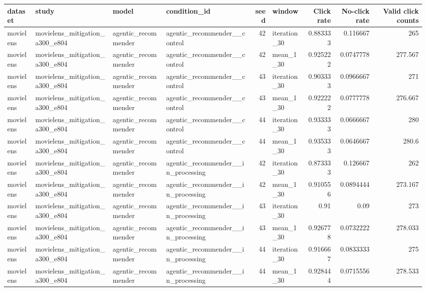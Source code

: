 \begin{table}[htbp!]
\centering
\small
\setlength{\tabcolsep}{3pt}
\renewcommand{\arraystretch}{1.1}
\begin{tabular}{llllrlrrr}
\hline
dataset & study & model & condition\_id & seed & window & Click rate & No-click rate & Valid click counts \\
\hline
movielens & movielens\_mitigation\_a300\_e804 & agentic\_recommender & agentic\_recommender\_\_control & 42 & iteration\_30 & 0.883333 & 0.116667 & 265 \\
movielens & movielens\_mitigation\_a300\_e804 & agentic\_recommender & agentic\_recommender\_\_control & 42 & mean\_1\_30 & 0.925222 & 0.0747778 & 277.567 \\
movielens & movielens\_mitigation\_a300\_e804 & agentic\_recommender & agentic\_recommender\_\_control & 43 & iteration\_30 & 0.903333 & 0.0966667 & 271 \\
movielens & movielens\_mitigation\_a300\_e804 & agentic\_recommender & agentic\_recommender\_\_control & 43 & mean\_1\_30 & 0.922222 & 0.0777778 & 276.667 \\
movielens & movielens\_mitigation\_a300\_e804 & agentic\_recommender & agentic\_recommender\_\_control & 44 & iteration\_30 & 0.933333 & 0.0666667 & 280 \\
movielens & movielens\_mitigation\_a300\_e804 & agentic\_recommender & agentic\_recommender\_\_control & 44 & mean\_1\_30 & 0.935333 & 0.0646667 & 280.6 \\
movielens & movielens\_mitigation\_a300\_e804 & agentic\_recommender & agentic\_recommender\_\_in\_processing & 42 & iteration\_30 & 0.873333 & 0.126667 & 262 \\
movielens & movielens\_mitigation\_a300\_e804 & agentic\_recommender & agentic\_recommender\_\_in\_processing & 42 & mean\_1\_30 & 0.910556 & 0.0894444 & 273.167 \\
movielens & movielens\_mitigation\_a300\_e804 & agentic\_recommender & agentic\_recommender\_\_in\_processing & 43 & iteration\_30 & 0.91 & 0.09 & 273 \\
movielens & movielens\_mitigation\_a300\_e804 & agentic\_recommender & agentic\_recommender\_\_in\_processing & 43 & mean\_1\_30 & 0.926778 & 0.0732222 & 278.033 \\
movielens & movielens\_mitigation\_a300\_e804 & agentic\_recommender & agentic\_recommender\_\_in\_processing & 44 & iteration\_30 & 0.916667 & 0.0833333 & 275 \\
movielens & movielens\_mitigation\_a300\_e804 & agentic\_recommender & agentic\_recommender\_\_in\_processing & 44 & mean\_1\_30 & 0.928444 & 0.0715556 & 278.533 \\

\end{tabular}
\end{table}
